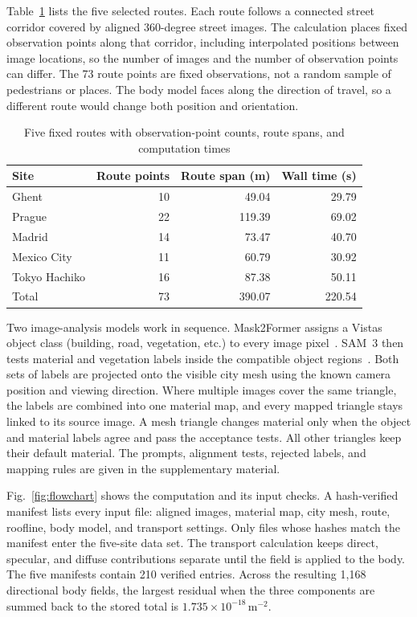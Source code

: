 \documentclass{ieeeaccess}
\begin{document}
Table~\ref{tab:routes} lists the five selected routes. Each route follows a
connected street corridor covered by aligned 360-degree street images. The
calculation places fixed observation points along that corridor, including
interpolated positions between image locations, so the number of images and
the number of observation points can differ. The 73 route points are fixed
observations, not a random sample of pedestrians or places. The body model
faces along the direction of travel, so a different route would change both
position and orientation.

\begin{table}[!t]
  \caption{Five fixed routes with observation-point counts, route spans, and computation times}
  \label{tab:routes}
  \centering
  \begin{tabular}{lrrr}
    \toprule
    Site & Route points & Route span (m) & Wall time (s) \\
    \midrule
    Ghent & 10 & 49.04 & 29.79 \\
    Prague & 22 & 119.39 & 69.02 \\
    Madrid & 14 & 73.47 & 40.70 \\
    Mexico City & 11 & 60.79 & 30.92 \\
    Tokyo Hachiko & 16 & 87.38 & 50.11 \\
    \midrule
    Total & 73 & 390.07 & 220.54 \\
    \bottomrule
  \end{tabular}
\end{table}

Two image-analysis models work in sequence. Mask2Former assigns a Vistas object
class (building, road, vegetation, etc.) to every image
pixel~\cite{mask2former,vistas}. SAM~3 then tests material and vegetation labels
inside the compatible object regions~\cite{sam3}. Both sets of labels are
projected onto the visible city mesh using the known camera position and viewing
direction. Where multiple images cover the same triangle, the labels are
combined into one material map, and every mapped triangle stays linked to its
source image. A mesh triangle changes material only when the object and
material labels agree and pass the acceptance tests. All other triangles keep
their default material. The prompts, alignment tests, rejected labels, and
mapping rules are given in the supplementary material.

Fig.~\ref{fig:flowchart} shows the computation and its input checks. A
hash-verified manifest lists every input file: aligned images, material map,
city mesh, route, roofline, body model, and transport settings. Only files whose
hashes match the manifest enter the five-site data set. The transport
calculation keeps direct, specular, and diffuse contributions separate until
the field is applied to the body. The five manifests contain 210 verified entries. Across the
resulting 1,168 directional body fields, the largest residual when the three
components are summed back to the stored total is
$1.735\times10^{-18}\,\mathrm{m}^{-2}$.
\end{document}
